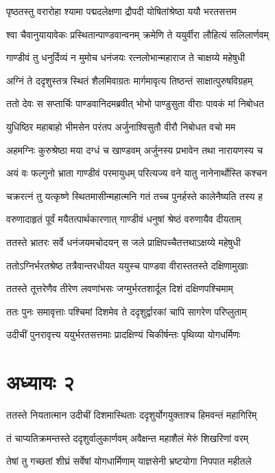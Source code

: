 \threelineshloka
{पृष्ठतस्तु वरारोहा श्यामा पद्मदलेक्षणा}
{द्रौपदी योषितांश्रेष्ठा ययौ भरतसत्तम}
{}


\twolineshloka
{श्वा चैवानुयायावेकः प्रस्थितान्पाण्डवान्वनम्}
{क्रमेणि ते ययुर्वीरा लौहित्यं सलिलार्णवम्}


\twolineshloka
{गाण्डीवं तु धनुर्दिव्यं न मुमोच धनंजयः}
{रत्नलोभान्महाराज ते चाक्षय्ये महेषुधी}


\twolineshloka
{अग्निं ते ददृशुस्तत्र स्थितं शैलमिवाग्रतः}
{मार्गमावृत्य तिष्ठन्तं साक्षात्पुरुषविग्रहम्}


\twolineshloka
{ततो देवः स सप्तार्चिः पाण्डवानिदमब्रवीत्}
{भोभो पाण्डुसुता वीराः पावकं मां निबोधत}


\twolineshloka
{युधिष्ठिर महाबाहो भीमसेन परंतप}
{अर्जुनाश्विसुतौ वीरौ निबोधत वचो मम}


\twolineshloka
{अहमग्निः कुरुश्रेष्ठा मया दग्धं च खाण्डवम्}
{अर्जुनस्य प्रभावेन तथा नारायणस्य च}


\twolineshloka
{अयं वः फल्गुनो भ्राता गाण्डीवं परमायुधम्}
{परित्यज्य वने यातु नानेनार्थोस्ति कश्चन}


\twolineshloka
{चक्ररत्नं तु यत्कृष्णे स्थितमासीन्महात्मनि}
{गतं तच्च पुनर्हस्ते कालेनैष्यति तस्य ह}


\twolineshloka
{वरुणादाहृतं पूर्वं मयैतत्पार्थकारणात्}
{गाण्डीवं धनुषां श्रेष्ठं वरुणायैव दीयताम्}


\twolineshloka
{ततस्ते भ्रातरः सर्वे धनंजयमचोदयन्}
{स जले प्राक्षिपच्चैतत्तथाऽक्षय्ये महेषुधी}


\twolineshloka
{ततोऽग्निर्भरतश्रेष्ठ तत्रैवान्तरधीयत}
{ययुस्च पाण्डवा वीरास्ततस्ते दक्षिणामुखाः}


\twolineshloka
{ततस्ते तूत्तरेणैव तीरेण लवणांभसः}
{जग्मुर्भरतशार्दूल दिशं दक्षिणपश्चिमाम्}


\twolineshloka
{ततः पुनः समावृत्ताः पश्चिमां दिशमेव ते}
{ददृशुर्द्वारकां चापि सागरेण परिप्लुताम्}


\twolineshloka
{उदीचीं पुनरावृत्त्य ययुर्भरतसत्तमाः}
{प्रादक्षिण्यं चिकीर्षन्तः पृथिव्या योगधर्मिणः}


\chapter{अध्यायः २}
\twolineshloka
{ततस्ते नियतात्मान उदीचीं दिशमास्थिताः}
{ददृशुर्योगयुक्ताश्च हिमवन्तं महागिरिम्}


\twolineshloka
{तं चाप्यतिक्रमन्तस्ते ददृशुर्वालुकार्णवम्}
{अवैक्षन्त महाशैलं मेरुं शिखरिणां वरम्}


\twolineshloka
{तेषां तु गच्छतां शीघ्रं सर्वेषां योगधार्मिणाम्}
{याज्ञसेनी भ्रष्टयोगा निपपात महीतले}


